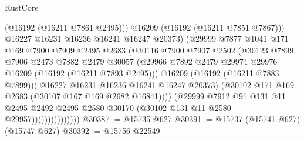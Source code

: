 \begin{lexlean}{RustCore}
\begin{coremodule}
                                      (@16192 (@16211 @7861 @2495)))
                                    @16209
                                    (@16192 (@16211 @7851 @7867)))
                                  @16227
                                  @16231
                                  @16236
                                  @16241
                                  @16247
                                  @20373)
                                (@29999
                                  @7877
                                  @1041
                                  @171
                                  @169
                                  @7900
                                  @7909
                                  @2495
                                  @2683
                                  (@30116
                                    @7900
                                    @7907
                                    @2502
                                    (@30123
                                      @7899
                                      @7906
                                      @2473
                                      @7882
                                      @2479
                                      @30057
                                      (@29966
                                        @7892
                                        @2479
                                        @29974
                                        @29976
                                        @16209
                                        (@16192 (@16211 @7893 @2495)))
                                      @16209
                                      (@16192 (@16211 @7883 @7899)))
                                    @16227
                                    @16231
                                    @16236
                                    @16241
                                    @16247
                                    @20373)
                                  (@30102 @171 @169 @2683 (@30107 @167 @169 @2682 @16841))))
                              (@29999
                                @7912
                                @91
                                @131
                                @11
                                @2495
                                @2492
                                @2495
                                @2580
                                @30170
                                (@30102 @131 @11 @2580 @29957)))))))))))))))
@30387 := @15735 @627
@30391 := @15737 (@15741 @627) (@15747 @627)
@30392 := @15756 @22549

\end{coremodule}
\end{lexlean}

